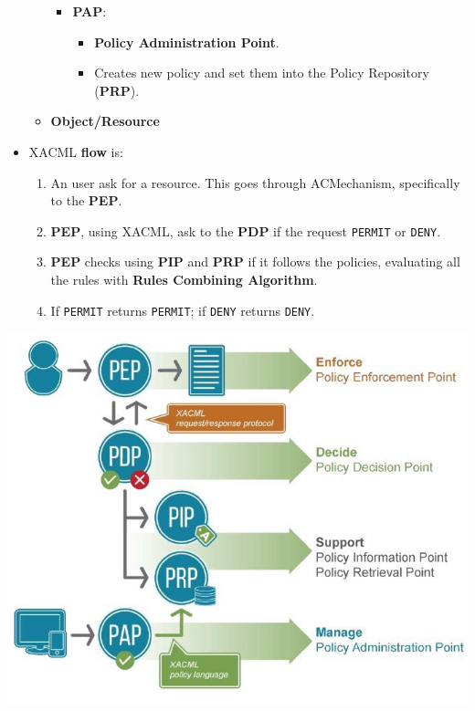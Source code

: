 \documentclass[9pt, letterpaper]{article}
\begin{document}
\begin{itemize}
\begin{itemize}
\begin{itemize}
		\item \textbf{PAP}: 
		\begin{itemize}
			\item \textbf{Policy Administration Point}.
			\item Creates new policy and set them into the Policy Repository (\textbf{PRP}).
		\end{itemize}				
		
	\end{itemize}
		\item \textbf{Object/Resource}
	\end{itemize}
	\item XACML \textbf{flow} is:
	\begin{enumerate}
		\item An user ask for a resource. This goes through ACMechanism, specifically to the \textbf{PEP}.
		\item \textbf{PEP}, using XACML, ask to the \textbf{PDP} if the request {\tt PERMIT} or {\tt DENY}.
		\item \textbf{PEP} checks using \textbf{PIP} and \textbf{PRP} if it follows the policies, evaluating all the rules with \textbf{Rules Combining Algorithm}.
		\item If {\tt PERMIT} returns {\tt PERMIT}; if {\tt DENY} returns {\tt DENY}.
	\end{enumerate}
\end{itemize}
\begin{center}
    \includegraphics[scale=0.6]{XACML.jpg}
\end{center}
\end{document}
